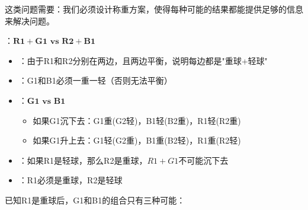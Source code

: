 这类问题需要：我们必须设计称重方案，使得每种可能的结果都能提供足够的信息来解决问题。

\begin{theorembox}[title=称重问题解答策略]
：$\mathbf{R1 + G1 \text{ vs } R2 + B1}$

\begin{itemize}
  \item {}：由于R1和R2分别在两边，且两边平衡，说明每边都是"重球+轻球"
  \item {}：G1和B1必须一重一轻（否则无法平衡）
  \item {}：$\mathbf{G1 \text{ vs } B1}$
    \begin{itemize}
      \item 如果G1沉下去：G1重(G2轻)，B1轻(B2重)，R1轻(R2重)
      \item 如果G1升上去：G1轻(G2重)，B1重(B2轻)，R1重(R2轻)
    \end{itemize}
\end{itemize}

\begin{itemize}
  \item {}：如果R1是轻球，那么R2是重球，$R1+G1$不可能沉下去
  \item {}：R1必须是重球，R2是轻球
\end{itemize}
\end{theorembox}

已知R1是重球后，G1和B1的组合只有三种可能：

